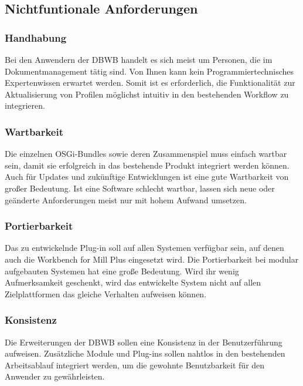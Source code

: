 {{}
\subsection{Nichtfuntionale Anforderungen}{

\subsubsection{Handhabung}{
Bei den Anwendern der \ac{DBWB} handelt es sich meist um Personen, die im Dokumentmanagement tätig sind. Von Ihnen kann kein Programmiertechnisches Expertenwissen erwartet werden. Somit ist es erforderlich, die Funktionalität zur Aktualisierung von Profilen möglichst intuitiv in den bestehenden Workflow zu integrieren.
}
\subsubsection{Wartbarkeit}{
Die einzelnen \ac{OSGi}-Bundles sowie deren Zusammenspiel muss einfach wartbar
sein, damit sie erfolgreich in das bestehende Produkt integriert werden können. Auch für Updates und zukünftige Entwicklungen ist eine gute Wartbarkeit von großer Bedeutung. Ist eine Software schlecht wartbar, lassen sich neue oder geänderte Anforderungen meist nur mit hohem Aufwand umsetzen.
}
\subsubsection{Portierbarkeit}{
Das zu entwickelnde Plug-in soll auf allen Systemen verfügbar sein, auf denen auch die Workbench for Mill Plus eingesetzt wird. Die Portierbarkeit bei modular aufgebauten Systemen hat eine große Bedeutung. Wird ihr wenig Aufmerksamkeit geschenkt, wird das entwickelte System nicht auf allen Zielplattformen das gleiche Verhalten aufweisen können.
}

\subsubsection{Konsistenz}{
Die Erweiterungen der \ac{DBWB} sollen eine Konsistenz in der Benutzerführung aufweisen. Zusätzliche Module und Plug-ins sollen nahtlos in den bestehenden Arbeitsablauf integriert werden, um die gewohnte Benutzbarkeit für den Anwender zu gewährleisten.
}


}

}

